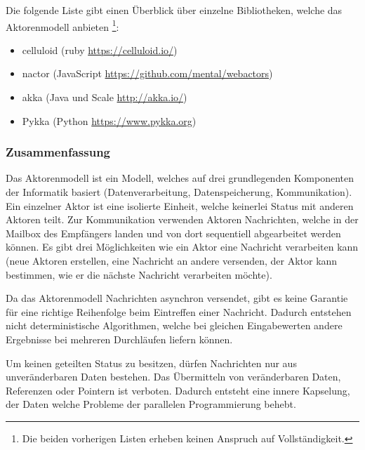 Die folgende Liste gibt einen Überblick über einzelne Bibliotheken, welche das Aktorenmodell anbieten \footnote{Die beiden vorherigen Listen erheben keinen Anspruch auf Vollständigkeit.}:

\begin{itemize}
  \item celluloid (ruby \url{https://celluloid.io/})
  \item nactor (JavaScript \url{https://github.com/mental/webactors})
  \item akka (Java und Scale \url{http://akka.io/})
  \item Pykka (Python \url{https://www.pykka.org})
\end{itemize}

\subsubsection{Zusammenfassung}
Das Aktorenmodell ist ein Modell, welches auf drei grundlegenden Komponenten der Informatik basiert (Datenverarbeitung, Datenspeicherung, Kommunikation). Ein einzelner Aktor ist eine isolierte Einheit, welche keinerlei Status mit anderen Aktoren teilt. Zur Kommunikation verwenden Aktoren Nachrichten, welche in der Mailbox des Empfängers landen und von dort sequentiell abgearbeitet werden können. Es gibt drei Möglichkeiten wie ein Aktor eine Nachricht verarbeiten kann (neue Aktoren erstellen, eine Nachricht  an andere versenden, der Aktor kann bestimmen, wie er die nächste Nachricht verarbeiten möchte).

Da das Aktorenmodell Nachrichten asynchron versendet, gibt es keine Garantie für eine richtige Reihenfolge beim Eintreffen einer Nachricht. Dadurch entstehen nicht deterministische Algorithmen, welche bei gleichen Eingabewerten andere Ergebnisse bei mehreren Durchläufen liefern können. 

Um keinen geteilten Status zu besitzen, dürfen Nachrichten nur aus unveränderbaren Daten bestehen. Das Übermitteln von veränderbaren Daten, Referenzen oder Pointern ist verboten. Dadurch entsteht eine innere Kapselung, der Daten welche Probleme der parallelen Programmierung behebt.